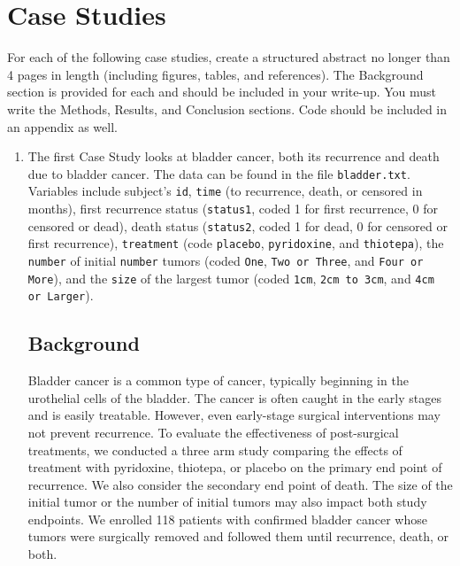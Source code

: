 \documentclass{article}
\begin{document}
	\newpage
	\section*{Case Studies}
	For each of the following case studies, create a structured abstract no longer than 4 pages in length (including figures, tables, and references). The Background section is provided for each and should be included in your write-up. You must write the Methods, Results, and Conclusion sections. Code should be included in an appendix as well.

	\begin{enumerate}
		\item The first Case Study looks at bladder cancer, both its recurrence and death due to bladder cancer. The data can be found in the file \texttt{bladder.txt}. Variables include subject's \texttt{id}, \texttt{time} (to recurrence, death, or censored in months), first recurrence status (\texttt{status1}, coded 1 for first recurrence, 0 for censored or dead), death status (\texttt{status2}, coded 1 for dead, 0 for censored or first recurrence), \texttt{treatment} (code \texttt{placebo}, \texttt{pyridoxine}, and \texttt{thiotepa}), the \texttt{number} of initial \texttt{number} tumors (coded \texttt{One}, \texttt{Two or Three}, and \texttt{Four or More}), and the \texttt{size} of the largest tumor (coded \texttt{1cm}, \texttt{2cm to 3cm}, and \texttt{4cm or Larger}).
			
	\subsection*{Background} %

	Bladder cancer is a common type of cancer, typically beginning in the urothelial cells of the bladder. The cancer is often caught in the early stages and is easily treatable. However, even early-stage surgical interventions may not prevent recurrence. To evaluate the effectiveness of post-surgical treatments, we conducted a three arm study comparing the effects of treatment with pyridoxine, thiotepa, or placebo on the primary end point of recurrence. We also consider the secondary end point of death. The size of the initial tumor or the number of initial tumors may also impact both study endpoints. We enrolled 118 patients with confirmed bladder cancer whose tumors were surgically removed and followed them until recurrence, death, or both.
		

\end{enumerate}
\end{document}
